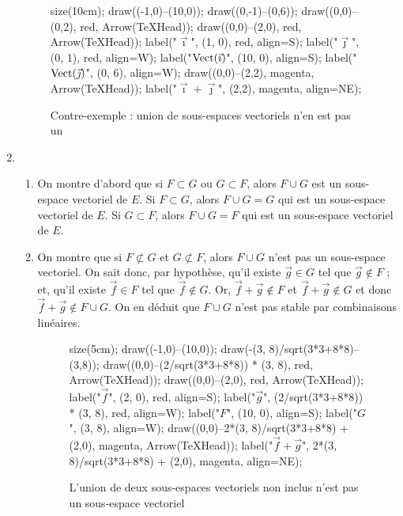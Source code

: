 \begin{exo}
\begin{enumerate}
			\begin{figure}[H]
				\centering
				\begin{asy}
					size(10cm);
					draw((-1,0)--(10,0));
					draw((0,-1)--(0,6));
					draw((0,0)--(0,2), red, Arrow(TeXHead));
					draw((0,0)--(2,0), red, Arrow(TeXHead));
					label("$\vec\imath$", (1, 0), red, align=S);
					label("$\vec\jmath$", (0, 1), red, align=W);
					label("$\operatorname{Vect}(\vec\imath)$", (10, 0), align=S);
					label("$\operatorname{Vect}(\vec\jmath)$", (0, 6), align=W);
					draw((0,0)--(2,2), magenta, Arrow(TeXHead));
					label("$\vec\imath + \vec\jmath$", (2,2), magenta, align=NE);
				\end{asy}
				\caption{Contre-exemple : union de sous-espaces vectoriels n'en est pas un}
			\end{figure}
		\item
			\begin{enumerate}
				\item On montre d'abord que si $F \subset G$\/ ou $G \subset F$, alors $F \cup G$\/ est un sous-espace vectoriel de $E$.
					Si $F \subset G$, alors $F \cup G = G$\/ qui est un sous-espace vectoriel de $E$.
					Si $G \subset F$, alors $F \cup G = F$\/ qui est un sous-espace vectoriel de $E$.
				\item On montre que si $F \not\subset G$\/ et $G \not\subset F$, alors $F \cup G$\/ n'est pas un sous-espace vectoriel.
					On sait donc, par hypothèse, qu'il existe $\vec{g} \in G$\/ tel que $\vec{g} \not\in F$\/ ; et, qu'il existe $\vec{f} \in F$\/ tel que $\vec{f} \not\in G$. Or, $\vec{f} + \vec{g} \not\in F$\/ et $\vec{f} + \vec{g} \not\in G$\/ et donc $\vec{f} + \vec{g} \not\in F \cup G$. On en déduit que $F \cup G$\/ n'est pas stable par combinaisons linéaires.
			\begin{figure}[H]
				\centering
				\begin{asy}
					size(5cm);
					draw((-1,0)--(10,0));
					draw(-(3, 8)/sqrt(3*3+8*8)--(3,8));
					draw((0,0)--(2/sqrt(3*3+8*8)) * (3, 8), red, Arrow(TeXHead));
					draw((0,0)--(2,0), red, Arrow(TeXHead));
					label("$\vec f$", (2, 0), red, align=S);
					label("$\vec g$", (2/sqrt(3*3+8*8)) * (3, 8), red, align=W);
					label("$F$", (10, 0), align=S);
					label("$G$", (3, 8), align=W);
					draw((0,0)--2*(3, 8)/sqrt(3*3+8*8) + (2,0), magenta, Arrow(TeXHead));
					label("$\vec f + \vec g$", 2*(3, 8)/sqrt(3*3+8*8) + (2,0), magenta, align=NE);
				\end{asy}
				\caption{L'union de deux sous-espaces vectoriels non inclus n'est pas un sous-espace vectoriel}
			\end{figure}

\end{enumerate}
\end{enumerate}
\end{exo}
